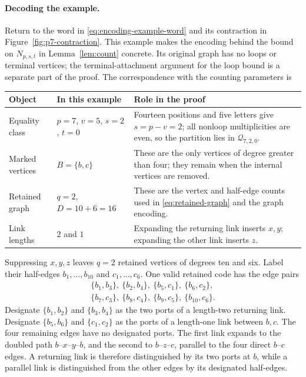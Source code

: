 \documentclass[11pt]{article}
\theoremstyle{definition}
\theoremstyle{remark}
\theoremstyle{plain}
\begin{document}
\paragraph{Decoding the example.}
Return to the word in \eqref{eq:encoding-example-word} and its
contraction in Figure~\ref{fig:p7-contraction}.
This example makes the encoding behind the bound on $N_{p,s,t}$
in Lemma~\ref{lem:count} concrete. Its original graph has no loops
or terminal vertices; the terminal-attachment argument for the loop
bound is a separate part of the proof. The correspondence with the
counting parameters is
\begin{center}
\begin{tabular}{p{}|p{}|p{}}
Object & In this example & Role in the proof\\ \hline
Equality class & $p=7$, $v=5$, $s=2$, $t=0$
 & Fourteen positions and five letters give $s=p-v=2$;
 all nonloop multiplicities are even, so the partition lies in
 $\mathcal Q_{7,2,0}$.\\
Marked vertices & $B=\{b,c\}$
 & These are the only vertices of degree greater than four;
 they remain when the internal vertices are removed.\\
Retained graph & $q=2$, $D=10+6=16$
 & These are the vertex and half-edge counts used in
 \eqref{eq:retained-graph} and the graph encoding.\\
Link lengths & $2$ and $1$
 & Expanding the returning link inserts $x,y$;
 expanding the other link inserts $z$.
\end{tabular}
\end{center}
Suppressing $x,y,z$ leaves $q=2$ retained vertices of degrees
ten and six. Label their half-edges $b_1,\ldots,b_{10}$ and
$c_1,\ldots,c_6$. One valid retained code has the edge pairs
\begin{equation}\label{eq:encoding-example-edges}
\begin{gathered}
 \{b_1,b_3\},\ \{b_2,b_4\},\
 \{b_5,c_1\},\ \{b_6,c_2\},\\
 \{b_7,c_3\},\ \{b_8,c_4\},\
 \{b_9,c_5\},\ \{b_{10},c_6\}.
\end{gathered}
\end{equation}
Designate $\{b_1,b_2\}$ and $\{b_3,b_4\}$ as the two ports
of a length-two returning link. Designate $\{b_5,b_6\}$ and
$\{c_1,c_2\}$ as the ports of a length-one link between $b,c$.
The four remaining edges have no designated ports. The first
link expands to the doubled path $b$--$x$--$y$--$b$,
and the second to $b$--$z$--$c$, parallel to the four direct
$b$--$c$ edges. A returning link is therefore distinguished by
its two ports at $b$, while a parallel link is distinguished
from the other edges by its designated half-edges.
\end{document}
